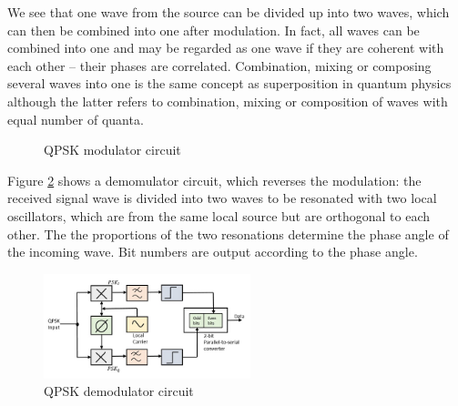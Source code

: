 \documentclass{book}
\begin{document}
We see that one wave from the source can be divided up into two waves, which can then be combined into one after modulation. In fact, all waves can be combined into one and may be regarded as one wave if they are coherent with each other -- their phases are correlated. Combination, mixing or composing several waves into one is the same concept as superposition in quantum physics although the latter refers to combination, mixing or composition of waves with equal number of quanta.

\begin{figure}[ht]
\caption{QPSK modulator circuit}
\label{modulator}
\end{figure}

Figure \ref{deodulator} shows a demomulator circuit, which reverses the modulation: the received signal wave is divided into two waves to be resonated with two local oscillators, which are from the same local source but are orthogonal to each other. The the proportions of the two resonations determine the phase angle of the incoming wave. Bit numbers are output according to the phase angle.

\begin{figure}[ht]
\includegraphics[width=6cm]{pic/qpsk_demodulator.jpg}
\caption{QPSK demodulator circuit}
\label{deodulator}
\end{figure}
\end{document}
